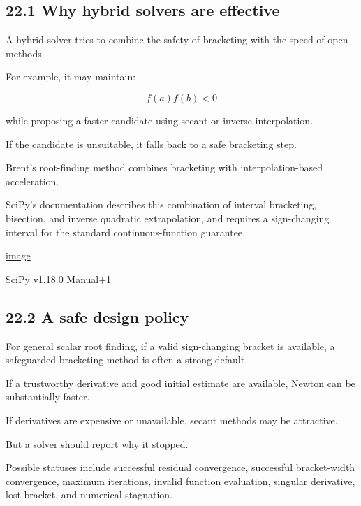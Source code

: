 \subsection{22.1 Why hybrid solvers are effective}\label{02-foundations-ii-ch028-why-hybrid-solvers-are-effective}

\hypertarget{02-foundations-ii-ch028-why-hybrid-solvers-are-effective}{}

A hybrid solver tries to combine the safety of bracketing with the speed of open methods.

For example, it may maintain:

\[ f(a)f(b)<0 \]

while proposing a faster candidate using secant or inverse interpolation.

If the candidate is unsuitable, it falls back to a safe bracketing step.

Brent's root-finding method combines bracketing with interpolation-based acceleration.

SciPy's  documentation describes this combination of interval bracketing, bisection, and inverse quadratic extrapolation, and requires a sign-changing interval for the standard continuous-function guarantee. 

\href{https://www.google.com/s2/favicons?domain=https://docs.scipy.org&sz=32}{image}

SciPy v1.18.0 Manual+1

\subsection{22.2 A safe design policy}\label{02-foundations-ii-ch028-a-safe-design-policy}

\hypertarget{02-foundations-ii-ch028-a-safe-design-policy}{}

For general scalar root finding, if a valid sign-changing bracket is available, a safeguarded bracketing method is often a strong default.

If a trustworthy derivative and good initial estimate are available, Newton can be substantially faster.

If derivatives are expensive or unavailable, secant methods may be attractive.

But a solver should report why it stopped.

Possible statuses include successful residual convergence, successful bracket-width convergence, maximum iterations, invalid function evaluation, singular derivative, lost bracket, and numerical stagnation.

